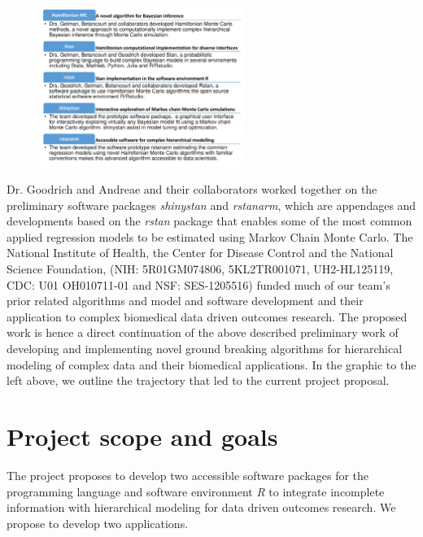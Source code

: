 \documentclass[11pt,notitlepage]{article}
\begin{document}
\begin{figure} %
    \centering
\includegraphics[width=0.6\textwidth]{Figures/SoftwareTrajectory.pdf}
\end{figure}

Dr. Goodrich and Andreae and their collaborators worked together on the preliminary software packages \textit{shinystan} and \textit{rstanarm}, which are appendages and developments based on the \textit{rstan} package that enables some of the most common applied regression models to be estimated using Markov Chain Monte Carlo. The National Institute of Health, the Center for Disease Control and the National Science Foundation, (NIH: 5R01GM074806, 5KL2TR001071, UH2-HL125119,  CDC: U01 OH010711-01 and NSF: SES-1205516) funded much of our team's prior related algorithms and model and software development and their application to complex biomedical data driven outcomes research. The proposed work is hence a direct continuation of the above described preliminary work of developing and implementing novel ground breaking algorithms for hierarchical modeling of complex data and their biomedical applications. In the graphic to the left above, we outline the trajectory that led to the current project proposal.


\section*{Project scope and goals }

The project proposes to develop two accessible software packages for the programming language and software environment \textit{R} to integrate incomplete information with hierarchical modeling for data driven outcomes research. We propose to develop two applications.
\end{document}
